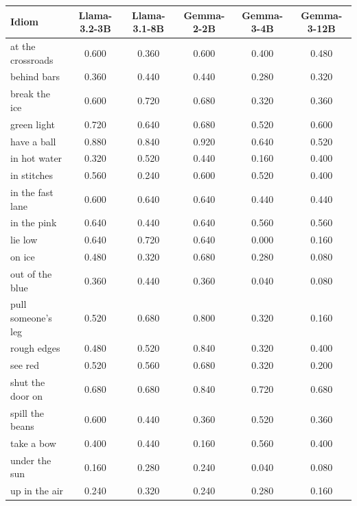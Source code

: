 \begin{tabular}{lccccc}
\toprule
Idiom & Llama-3.2-3B & Llama-3.1-8B & Gemma-2-2B & Gemma-3-4B & Gemma-3-12B \\
\midrule
at the crossroads & 0.600 & 0.360 & 0.600 & 0.400 & 0.480 \\
behind bars & 0.360 & 0.440 & 0.440 & 0.280 & 0.320 \\
break the ice & 0.600 & 0.720 & 0.680 & 0.320 & 0.360 \\
green light & 0.720 & 0.640 & 0.680 & 0.520 & 0.600 \\
have a ball & 0.880 & 0.840 & 0.920 & 0.640 & 0.520 \\
in hot water & 0.320 & 0.520 & 0.440 & 0.160 & 0.400 \\
in stitches & 0.560 & 0.240 & 0.600 & 0.520 & 0.400 \\
in the fast lane & 0.600 & 0.640 & 0.640 & 0.440 & 0.440 \\
in the pink & 0.640 & 0.440 & 0.640 & 0.560 & 0.560 \\
lie low & 0.640 & 0.720 & 0.640 & 0.000 & 0.160 \\
on ice & 0.480 & 0.320 & 0.680 & 0.280 & 0.080 \\
out of the blue & 0.360 & 0.440 & 0.360 & 0.040 & 0.080 \\
pull someone's leg & 0.520 & 0.680 & 0.800 & 0.320 & 0.160 \\
rough edges & 0.480 & 0.520 & 0.840 & 0.320 & 0.400 \\
see red & 0.520 & 0.560 & 0.680 & 0.320 & 0.200 \\
shut the door on & 0.680 & 0.680 & 0.840 & 0.720 & 0.680 \\
spill the beans & 0.600 & 0.440 & 0.360 & 0.520 & 0.360 \\
take a bow & 0.400 & 0.440 & 0.160 & 0.560 & 0.400 \\
under the sun & 0.160 & 0.280 & 0.240 & 0.040 & 0.080 \\
up in the air & 0.240 & 0.320 & 0.240 & 0.280 & 0.160 \\
\bottomrule
\end{tabular}

